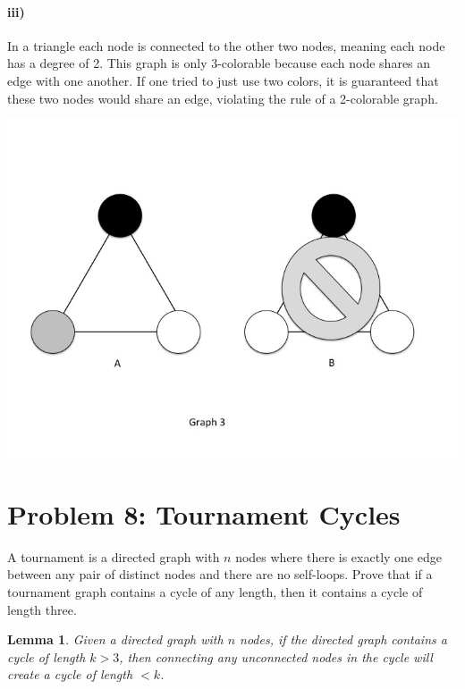 \documentclass[10pt,letter]{article}
\newtheorem{lem}{Lemma}
\begin{document}
\paragraph{iii)}
In a triangle each node is connected to the other two nodes, meaning each node has a degree of 2. This graph is only 3-colorable because each node shares an edge with one another. If one tried to just use two colors, it is guaranteed that these two nodes would share an edge, violating the rule of a 2-colorable graph.  
\begin{minipage}{.8\textwidth}
\includegraphics[width=.8\linewidth]{hw3_slide3.jpg}
\end{minipage}

\pagebreak

\section*{Problem 8: Tournament Cycles}
A tournament is a directed graph with $n$ nodes where there is exactly one edge between any pair of distinct nodes and there are no self-loops. Prove that if a tournament graph contains a cycle of any length, then it contains a cycle of length three.

\begin{lem} \label{lem:q8_1} Given a directed graph with $n$ nodes, if the directed graph contains a cycle of length $k > 3$, then connecting any unconnected nodes in the cycle will create a cycle of length $< k$.
\end{lem}
\end{document}
